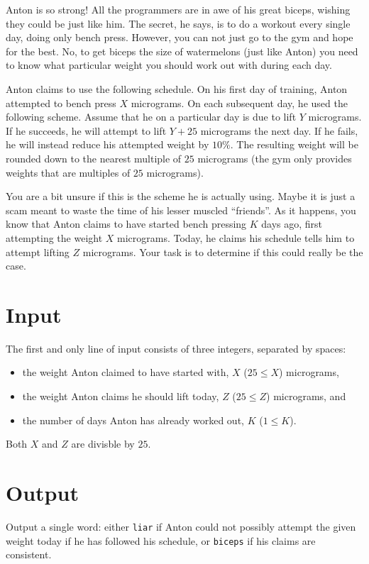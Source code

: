 Anton is so strong!
All the programmers are in awe of his great biceps, wishing they could be just like him.
The secret, he says, is to do a workout every single day, doing only bench press.
However, you can not just go to the gym and hope for the best.
No, to get biceps the size of watermelons (just like Anton) you need to know what particular weight you should work out with during each day.

Anton claims to use the following schedule.
On his first day of training, Anton attempted to bench press $X$ micrograms.
On each subsequent day, he used the following scheme.
Assume that he on a particular day is due to lift $Y$ micrograms.
If he succeeds, he will attempt to lift $Y + 25$ micrograms the next day.
If he fails, he will instead reduce his attempted weight by $10\%$.
The resulting weight will be rounded down to the nearest multiple of $25$ micrograms (the gym only provides weights that are multiples of $25$ micrograms).

You are a bit unsure if this is the scheme he is actually using.
Maybe it is just a scam meant to waste the time of his lesser muscled ``friends''.
As it happens, you know that Anton claims to have started bench pressing $K$ days ago, first attempting the weight $X$ micrograms.
Today, he claims his schedule tells him to attempt lifting $Z$ micrograms.
Your task is to determine if this could really be the case.

\section*{Input}
The first and only line of input consists of three integers, separated by spaces:
\begin{itemize}
  \item the weight Anton claimed to have started with, $X$ ($25 \le X$) micrograms,
  \item the weight Anton claims he should lift today, $Z$ ($25 \le Z$) micrograms, and
  \item the number of days Anton has already worked out, $K$ ($1 \le K$).
\end{itemize}

Both $X$ and $Z$ are divisble by $25$.

\section*{Output}
Output a single word: either \texttt{liar} if Anton could not possibly attempt the given weight today if he has followed his schedule, or \texttt{biceps} if his claims are consistent.

